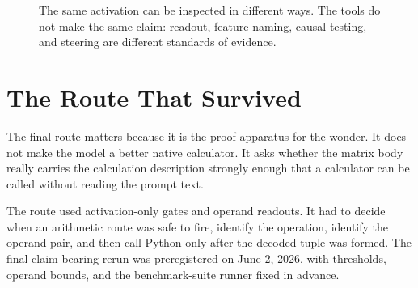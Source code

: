 \documentclass[acmsmall,screen,nonacm]{acmart}
\begin{document}
\begin{figure}[t]
  \centering
  \caption{The same activation can be inspected in different ways. The tools do
  not make the same claim: readout, feature naming, causal testing, and steering
  are different standards of evidence.}
\end{figure}

\section{The Route That Survived}

The final route matters because it is the proof apparatus for the wonder. It
does not make the model a better native calculator. It asks whether the matrix
body really carries the calculation description strongly enough that a
calculator can be called without reading the prompt text.

The route used activation-only gates and operand readouts. It had to decide
when an arithmetic route was safe to fire, identify the operation, identify the
operand pair, and then call Python only after the decoded tuple was formed. The
final claim-bearing rerun was preregistered on June 2, 2026, with thresholds,
operand bounds, and the benchmark-suite runner fixed in advance.
\end{document}
